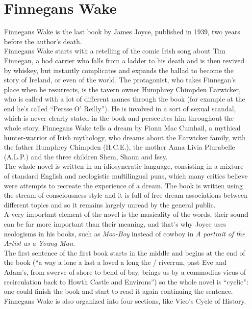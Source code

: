 \documentclass[10pt]{report}
\begin{document}
		\section{Finnegans Wake}
			Finnegans Wake is the last book by James Joyce, published in 1939, two years before the author's death. \\
			Finnegans Wake starts with a retelling of the comic Irish song about Tim Finnegan, a hod carrier who falls from a ladder to his death and is then revived by whiskey, but instantly complicates and expands the ballad to become the story of Ireland, or even of the world. The protagonist, who takes Finnegan's place when he resurrects, is the tavern owner Humphrey Chimpden Earwicker, who is called with a lot of different names through the book (for example at the end he's called ``Persse O' Reilly''). He is involved in a sort of sexual scandal, which is never clearly stated in the book and persecutes him throughout the whole story. Finnegans Wake tells a dream by Fionn Mac Cumhail, a mythical hunter-warrior of Irish mythology, who dreams about the Earwicker family, with the father Humphrey Chimpden (H.C.E.), the mother Anna Livia Plurabelle (A.L.P.) and the three children Shem, Shaun and Issy.\\
			The whole novel is written in an idiosyncratic language, consisting in a mixture of standard English and neologistic multilingual puns, which many critics believe were attempts to recreate the experience of a dream. The book is written using the stream of consciousness style and it is full of free dream associations between different topics and so it remains largely unread by the general public.\\
			A very important element of the novel is the musicality of the words, their sound can be far more important than their meaning, and that's why Joyce uses neologisms in his books, such as \textit{Moo-Boy} instead of cowboy in \textit{A portrait of the Artist as a Young Man}. \\
			The first sentence of the first book starts in the middle and begins at the end of the book (``a way a lone a last a loved a long the / riverrun, past Eve and Adam's, from swerve of shore to bend of bay, brings us by a commodius vicus of recirculation back to Howth Castle and Environs'') so the whole novel is ``cyclic'': one could finish the book and start to read it again continuing the sentence. Finnegans Wake is also organized into four sections, like Vico's Cycle of History.
\end{document}
